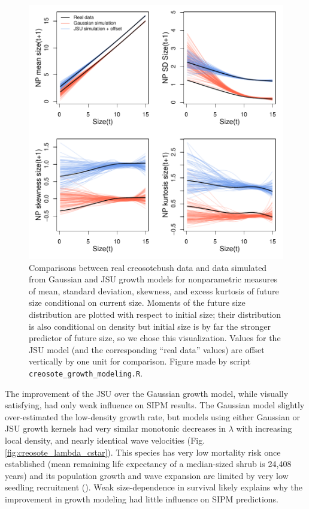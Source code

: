 \documentclass[12pt]{article}
\begin{document}
\begin{spacing}{1.35}
\begin{figure}[tbp]
	\centering
	\includegraphics[width=1.0\textwidth]{figures/creosote_JSU_fit.pdf}
	\caption{Comparisons between real creosotebush data and data simulated from Gaussian and JSU growth models for nonparametric measures of mean, standard deviation, skewness, and excess kurtosis of future size conditional on current size. 
		Moments of the future size distribution are plotted with respect to initial size; their distribution is also conditional on density but initial size is by far the stronger predictor of future size, so we chose this visualization. 
		Values for the JSU model (and the corresponding ``real data'' values) are offset vertically by one unit for comparison. Figure made by script \texttt{creosote\_growth\_modeling.R}.}
	\label{fig:creosote_JSU}
\end{figure} 

The improvement of the JSU over the Gaussian growth model, while visually satisfying, had only weak influence on SIPM results. 
The Gaussian model slightly over-estimated the low-density growth rate, but models using either Gaussian or JSU growth kernels had very similar monotonic decreases in $\lambda$ with increasing local density, and nearly identical wave velocities (Fig. \ref{fig:creosote_lambda_cstar}). 
This species has very low mortality risk once established (mean remaining life expectancy of a median-sized shrub is 24,408 years) and its population growth and wave expansion are limited by very low seedling recruitment (\citep{drees2023demography}). 
Weak size-dependence in survival likely explains why the improvement in growth modeling had little influence on SIPM predictions. 


\end{spacing}
\end{document}

